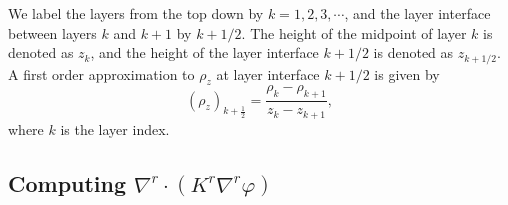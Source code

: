 \documentclass[12pt]{report}
\begin{document}
We label the layers from the top down by $k=1,2,3,\cdots$, and the 
layer interface between layers $k$ and $k+1$ by $k+1/2$. The height
of the midpoint of layer $k$ is denoted as $z_k$, and the height of 
the layer interface $k+1/2$ is denoted as $z_{k+1/2}$. 
A first order 
approximation to $\rho_z$ at layer interface $k+1/2$ is given by 
\begin{equation}
  \left(\rho_z\right)_{k+\frac{1}{2}} = 
  \dfrac{\rho_k - \rho_{k+1}}{z_k - z_{k+1}},\label{eq:21}
\end{equation}
where $k$ is the layer index.



\subsection{Computing $\nabla^r\cdot(K^r\nabla^r\varphi)$}
\end{document}
